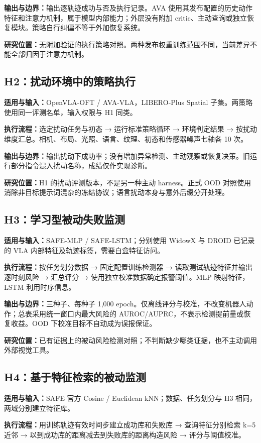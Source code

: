 \documentclass[UTF8,11pt,a4paper,fontset=none]{ctexart}
\begin{document}
\textbf{输出与边界：}输出逐轨迹成功与否及执行记录。AVA 使用其发布配置的历史动作特征和注意力机制，属于模型内部能力；外层没有附加 critic、主动查询或独立恢复模块。策略自行纠偏不等于外加恢复系统。

\textbf{研究位置：}无附加验证的执行策略对照。两种发布权重训练范围不同，当前差异不能全部归因于注意力机制。

\subsection*{H2：扰动环境中的策略执行}
\textbf{适用与输入：}OpenVLA-OFT / AVA-VLA，LIBERO-Plus Spatial 子集。两策略使用同一评测名单，输入权限与 H1 同类。

\textbf{执行流程：}选定扰动任务与初态 → 运行标准策略循环 → 环境判定结果 → 按扰动维度汇总。相机、布局、光照、语言、纹理、初态和传感器噪声七轴各 10 次。

\textbf{输出与边界：}输出扰动下成功率；没有增加异常检测、主动观察或恢复决策。旧运行部分指令混入扰动名称，成绩仅作实现诊断。

\textbf{研究位置：}H1 的扰动评测版本，不是另一种主动 harness。正式 OOD 对照使用消除非目标提示词混杂的冻结协议；语言扰动本身与意外后缀分开处理。

\subsection*{H3：学习型被动失败监测}
\textbf{适用与输入：}SAFE-MLP / SAFE-LSTM；分别使用 WidowX 与 DROID 已记录的 VLA 内部特征及轨迹标签，需要白盒特征访问。

\textbf{执行流程：}按任务划分数据 → 固定配置训练检测器 → 读取测试轨迹特征并输出逐时刻风险 → 汇总评分 → 使用独立校准数据确定报警阈值。MLP 映射特征，LSTM 利用时序信息。

\textbf{输出与边界：}三种子、每种子 1,000 epoch。仅离线评分与校准，不改变机器人动作；总表采用统一窗口内最大风险的 AUROC/AUPRC，不表示检测提前量或恢复收益。OOD 下校准目标不自动成为误报保证。

\textbf{研究位置：}已有证据上的被动风险检测对照；不判断缺少哪类证据，也不主动调用外部视觉工具。

\clearpage
\subsection*{H4：基于特征检索的被动监测}
\textbf{适用与输入：}SAFE 官方 Cosine / Euclidean kNN；数据、任务划分与 H3 相同，两域分别建立特征库。

\textbf{执行流程：}用训练轨迹有效时间步建立成功库和失败库 → 查询特征分别检索 k=5 近邻 → 以到成功库的距离减去到失败库的距离构造风险 → 评分与阈值校准。
\end{document}
